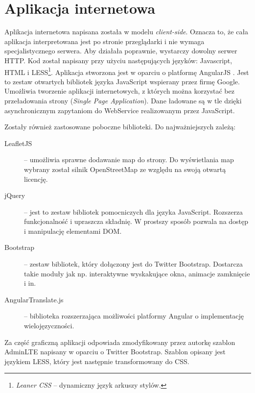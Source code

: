 \documentclass[a4paper]{book}
\begin{document}
		\section{Aplikacja internetowa} 
			
		Aplikacja internetowa napisana została w modelu \emph{client-side}. Oznacza to, że cała aplikacja interpretowana jest po stronie przeglądarki i nie wymaga specjalistycznego serwera. Aby działała poprawnie, wystarczy dowolny serwer HTTP. Kod został napisany przy użyciu następujących języków: Javascript, HTML i LESS\footnote{\emph{Leaner CSS} -- dynamiczny język arkuszy stylów.}. 
		Aplikacja stworzona jest w oparciu o platformę AngularJS \cite{keylist}. Jest to zestaw otwartych bibliotek języka JavaScript wspierany przez firmę Google. Umożliwia tworzenie aplikacji internetowych, z których można korzystać bez przeładowania strony (\emph{Single Page Application}). Dane ładowane są w tle dzięki asynchronicznym zapytaniom do WebService realizowanym przez JavaScript.
		
		Zostały również zastosowane poboczne biblioteki. Do najważniejszych zależą:
		
		\begin{description}
			
			\item[LeafletJS] \cite{id:Leaflet} -- 
			umożliwia sprawne dodawanie map do strony. Do wyświetlania map wybrany został silnik OpenStreetMap \cite{id:OpenStreetMaps} ze względu na swoją otwartą licencję.
			\item[jQuery] \cite{id:jQuery} -- 
			jest to zestaw bibliotek pomocniczych dla języka JavaScript. Rozszerza funkcjonalność i upraszcza składnię. W prostszy sposób pozwala na dostęp i manipulację elementami DOM.
			\item[Bootstrap] \cite{id:Bootstrap} -- 
			zestaw bibliotek, który dołączony jest do Twitter Bootstrap. Dostarcza takie moduły jak np. interaktywne wyskakujące okna, animacje zamknięcie i in.
			\item[AngularTranslate.js] \cite{id:AngularTranslate} -- 
			biblioteka rozszerzająca możliwości platformy Angular o implementację wielojęzyczności.  
		
		\end{description}
				
		Za część graficzną aplikacji odpowiada zmodyfikowany przez autorkę szablon AdminLTE \cite{id:AdminLTE} napisany w oparciu o Twitter Bootstrap. Szablon opisany jest językiem LESS, który jest następnie transformowany do CSS.
		
\end{document}
